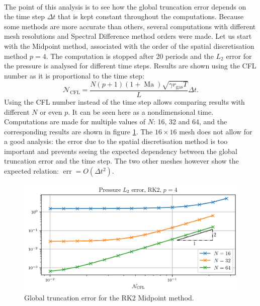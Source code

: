       \paragraph{}
      The point of this analysis is to see how the global truncation error depends on the time step $\Delta t$ that is kept constant throughout the computations.
      Because some methods are more accurate than others, several computations with different mesh resolutions and Spectral Difference method orders were made.
      Let us start with the Midpoint method, associated with the order of the spatial discretisation method $p = 4$. The computation is stopped after 20 periods and the $L_2$ error for the pressure is analysed for different time steps.
      Results are shown using the CFL number as it is proportional to the time step:
      \begin{equation}
        \mathcal{N}_\textrm{CFL} = \frac{N \left(p + 1\right) \left(1 + \operatorname{Ma}\right) \sqrt{\gamma r_\textrm{gas} T}}{L} \Delta t .
      \end{equation}
      Using the CFL number instead of the time step allows comparing results with different $N$ or even $p$.
      It can be seen here as a nondimensional time.
      Computations are made for multiple values of $N$: 16, 32 and 64, and the corresponding results are shown in figure \ref{fig:covo_rk2}.
      The $16\times16$ mesh does not allow for a good analysis: the error due to the spatial discretisation method is too important and prevents seeing the expected dependency between the global truncation error and the time step.
      The two other meshes however show the expected relation: $\operatorname{err} = O\left(\Delta t^2\right)$.

      \begin{figure}
        \centering
        \includegraphics{figures/covo_rk2.png}
        \caption{Global truncation error for the RK2 Midpoint method.}
        \label{fig:covo_rk2}
      \end{figure}

